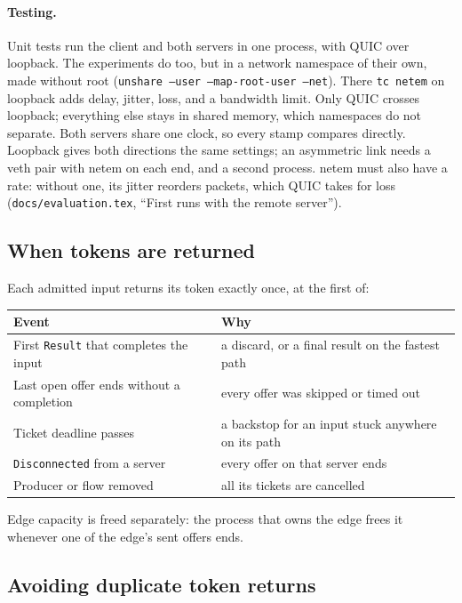 \documentclass[11pt]{article}
\newcommand{\code}[1]{\texttt{#1}}
\begin{document}
\paragraph{Testing.} Unit tests run the client and both servers in one
process, with QUIC over loopback. The experiments do too, but in a network
namespace of their own, made without root
(\code{unshare --user --map-root-user --net}). There \code{tc netem} on
loopback adds delay, jitter, loss, and a bandwidth limit. Only QUIC crosses
loopback; everything else stays in shared memory, which namespaces do not
separate. Both servers share one clock, so every stamp compares directly.
Loopback gives both directions the same settings; an asymmetric link needs a
veth pair with netem on each end, and a second process. netem must also have
a rate: without one, its jitter reorders packets, which QUIC takes for loss
(\code{docs/evaluation.tex}, ``First runs with the remote server'').

\subsection{When tokens are returned}

Each admitted input returns its token exactly once, at the first of:

\begin{center}
\small
\begin{tabular}{@{}ll@{}}
\toprule
Event & Why \\
\midrule
First \code{Result} that completes the input
  & a discard, or a final result on the fastest path \\
Last open offer ends without a completion
  & every offer was skipped or timed out \\
Ticket deadline passes
  & a backstop for an input stuck anywhere on its path \\
\code{Disconnected} from a server
  & every offer on that server ends \\
Producer or flow removed
  & all its tickets are cancelled \\
\bottomrule
\end{tabular}
\end{center}

Edge capacity is freed separately: the process that owns the edge frees it
whenever one of the edge's sent offers ends.

\subsection{Avoiding duplicate token returns}
\label{sec:dup}
\end{document}
